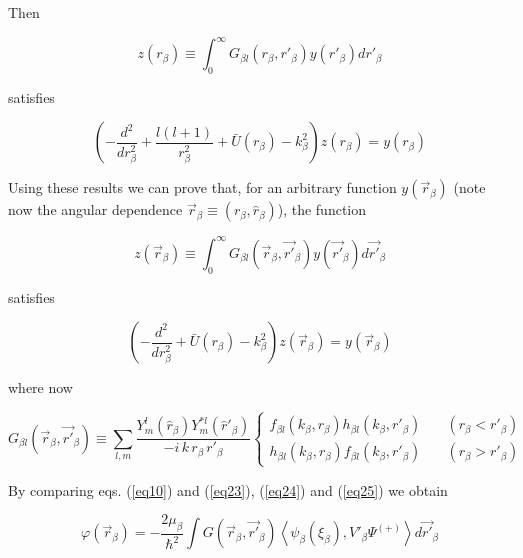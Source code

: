 Then

 \begin{equation}\label{eq21}
z(r_ \beta) \equiv \int _0^\infty G_{\beta l} ( r_ \beta, r'_ \beta) y(r'_ \beta) dr'_ \beta
\end{equation}

satisfies

\begin{equation}\label{eq22}
\left( -\frac{d^2}{dr^2_\beta}+\frac{l(l+1)}{r^2_\beta}+\bar U (r_ \beta)-k_\beta^2\right) z(r_ \beta)= y(r_ \beta)
\end{equation}


Using these results we can prove that, for an arbitrary function $y(\vec r_ \beta)$ (note now the angular dependence $\vec r_ \beta \equiv (r_ \beta ,\hat r_ \beta )$), the function


 \begin{equation}\label{eq23}
z(\vec r_ \beta) \equiv \int _0^\infty G_{\beta l} (\vec r_ \beta,\vec {r'}_ \beta) y(\vec {r'}_ \beta) d\vec {r'}_ \beta
\end{equation}


satisfies

\begin{equation}\label{eq24}
\left( -\frac{d^2}{dr^2_\beta}+\bar U (r_ \beta)-k_\beta^2\right) z(\vec r_ \beta)= y(\vec r_ \beta)
\end{equation}


where now


 \begin{equation}\label{eq25}
G_{\beta l} (\vec r_ \beta,\vec {r'}_ \beta) \equiv \sum_{l,m} \frac{Y_m^l(\hat r_ \beta)Y_m^{*l}(\hat r'_ \beta)}
{-i\, k \,r_ \beta\, r'_ \beta}
\left \lbrace \begin{aligned}
f_{\beta l}( k_ \beta, r_ \beta) h_{\beta l}( k_ \beta, r'_ \beta) &\quad( r_ \beta< r'_ \beta)\\
h_{\beta l}( k_ \beta, r_ \beta) f_{\beta l}( k_ \beta, r'_ \beta) &\quad( r_ \beta>r'_ \beta)
\end{aligned}
\right.
\end{equation}

By comparing eqs. (\ref{eq10}) and (\ref{eq23}), (\ref{eq24}) and (\ref{eq25}) we obtain

\begin{equation}\label{eq26}
\varphi(\vec r_ \beta)=-\frac{2 \mu_\beta}{\hbar^2} \int G (\vec r_ \beta,\vec {r'}_ \beta)\left\langle
\psi_\beta (\xi_\beta),V'_\beta \Psi^{(+)}\right\rangle  d\vec {r'}_ \beta
\end{equation}

